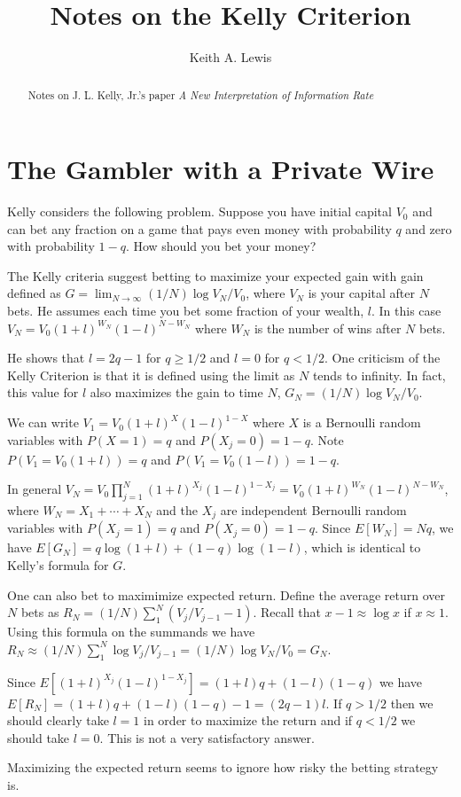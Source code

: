 \documentclass[11pt,fleqn]{article}
\begin{document}
\title{Notes on the Kelly Criterion}
\author{Keith A. Lewis}
\maketitle

\begin{abstract}
Notes on J. L. Kelly, Jr.'s paper
{\it A New Interpretation of Information Rate}
\end{abstract}

\section{The Gambler with a Private Wire}

Kelly considers the following problem.  Suppose you have initial capital
$V_0$ and can bet any fraction on a game that pays even money with
probability $q$ and zero with probability $1 - q$.  How should you bet
your money?

The Kelly criteria suggest betting to maximize your expected gain with
gain defined
as $G = \lim_{N\to\infty}(1/N)\log V_N/V_0$, where $V_N$ is your capital
after $N$ bets. He assumes each time you bet some fraction of your wealth,
$l$. In this case $V_N = V_0 (1 + l)^{W_N} (1 - l)^{N - W_N}$ where
$W_N$ is the number of wins after $N$ bets.

He shows that $l = 2q - 1$ for $q \ge 1/2$ and $l = 0$ for $q < 1/2$.
One criticism of the Kelly Criterion is that it is defined using the
limit as $N$ tends to infinity. In fact, this value for $l$ also maximizes
the gain to time $N$, $G_N = (1/N)\log V_N/V_0$.

We can write $V_1 = V_0 (1 + l)^X (1 - l)^{1 - X}$ where $X$ is a
Bernoulli random variables with $P(X = 1) = q$ and $P(X_j = 0) = 1 -
q$. Note $P(V_1 = V_0(1 + l)) = q$ and $P(V_1 = V_0(1 - l)) = 1 - q$.

In general $V_N = V_0 \prod_{j=1}^N (1 + l)^{X_j} (1 - l)^{1 - X_j}
= V_0 (1 + l)^{W_N}(1 - l)^{N - W_N}$, where $W_N = X_1 + \cdots + X_N$
and the $X_j$ are independent Bernoulli random variables with
$P(X_j = 1) = q$ and $P(X_j = 0) = 1 - q$.  Since $E[W_N] = Nq$, we
have $E[G_N] = q\log(1 + l) + (1 - q)\log(1 - l)$, which is identical
to Kelly's formula for $G$.


One can also bet to maximimize expected return. Define the average return
over $N$ bets as  $R_N = (1/N)\sum_1^N (V_j/V_{j - 1} - 1)$. Recall
that $x - 1 \approx \log x$ if $x \approx 1$. Using this formula on
the summands we have $R_N \approx (1/N)\sum_1^N \log V_j/V_{j - 1} =
(1/N)\log V_N/V_0 = G_N$.

Since $E[(1 + l)^{X_j} (1 - l)^{1 - X_j}] = (1 + l)q + (1 - l)(1 - q)$
we have $E[R_N] = (1 + l)q + (1 - l)(1 - q) - 1 = (2q - 1)l$. If $q >
1/2$ then we should clearly take $l = 1$ in order to maximize the return
and if $q < 1/2$ we should take $l = 0$. This is not a very satisfactory
answer.

Maximizing the expected return seems to ignore how risky the betting
strategy is. 
\end{document}
